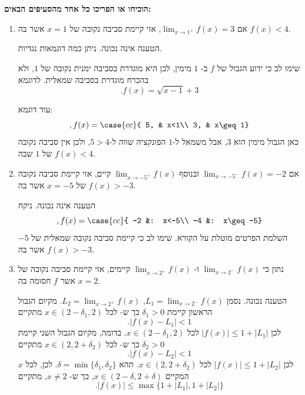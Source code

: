 \textbf{
הוכיחו או הפריכו
כל אחד מהסעיפים הבאים:}
\begin{enumerate}
    \item
אם
$\displaystyle\lim_{x\to 1^+}f(x)=3$,
    אזי קיימת סביבה נקובה של
    $x=1$
    אשר בה
    $f(x)<4$.
\ifsol
{}
\begin{solbox}
הטענה אינה נכונה.
ניתן כמה דוגמאות נגדיות.

שימו לב כי ידוע הגבול של
$f$
ב-
$1$
מימין, לכן היא מוגדרת בסביבה ימנית נקובה של
$1$,
ולא בהכרח מוגדרת בסביבה שמאלית. לדוגמא
$$.f(x)=\sqrt{x-1}+3$$

עוד דוגמא:
$$,f(x) = \case{cc}{
       5, &  x<1\\ 3, & x\geq 1}$$
כאן הגבול מימין הוא $3$, אבל משמאל ל-$1$ הפונקציה שווה ל-$5>4$, ולכן אין סביבה נקובה של $1$ שבה $f(x)<4$.
\end{solbox}
\fi

    \item
אם
$\displaystyle\lim_{x\to -5^-}f(x)=-2$
    ובנוסף
    $\displaystyle\lim_{x\to -5^+}f(x)$
קיים,
    אזי קיימת סביבה נקובה של
    $x=-5$
    אשר בה
    $f(x)>-3$.
\ifsol
{}
\begin{solbox}
הטענה אינה נכונה.
ניקח
$$,f(x) = \case{cc}{
       -2 &:  x<-5\\
       -4 &: x\geq -5}$$
       השלמת הפרטים מוטלת על הקורא.
שימו לב כי קיימת סביבה נקובה שמאלית של
$-5$
אשר בה
$f(x)>-3$.
\end{solbox}
\fi

    \item נתון כי
    $\displaystyle\lim_{x\to2^-}f(x)$
    ו-
    $\displaystyle\lim_{x\to2^+}f(x)$
    קיימים,
    אזי קיימת סביבה נקובה של
    $x=2$
    אשר
    $f$
    חסומה
    בה.
\ifsol
{}
\begin{solbox}
הטענה נכונה. נסמן
$L_1=\displaystyle\lim_{x\to2^-}f(x)$,
$L_2=\displaystyle\lim_{x\to2^+}f(x)$.
מקיום הגבול
הראשון
קיימת
$\delta_1>0$
כך ש-
לכל
$x\in(2-\delta_1,2)$
מתקיים
$$.|f(x)-L_1|<1$$
לכן
$|f(x)|\leq 1+|L_1|$
לכל
$x\in(2-\delta_1,2)$.
בדומה,
מקיום הגבול
השני
קיימת
$\delta_2>0$
כך ש-
לכל
$x\in(2,2+\delta_2)$
מתקיים
$$.|f(x)-L_2|<1$$
לכן
$|f(x)|\leq 1+|L_2|$
לכל
$x\in(2,2+\delta_2)$.
תהא
$\delta=\min\{\delta_1,\delta_2\}$.
לכן, לכל
$x$
המקיים
$x\in(2-\delta,2+\delta)$,
כך ש-
$x\neq 2$,
מתקיים
$$.|f(x)|\leq\max\{1+|L_1|,1+|L_2|\}$$
\end{solbox}
\fi


\end{enumerate}
